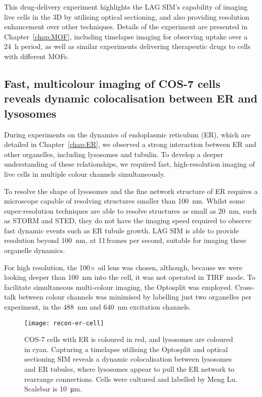 This drug-delivery experiment highlights the LAG SIM's capability of imaging live cells in the 3D by utilising optical sectioning, and also providing resolution enhancement over other techniques. 
Details of the experiment are presented in Chapter~\ref{chap:MOF}, including timelapse imaging for observing uptake over a \SI{24}{\hour} period, as well as similar experiments delivering therapeutic drugs to cells with different MOFs. 

\subsection{Fast, multicolour imaging of COS-7 cells reveals dynamic colocalisation between ER and lysosomes}
During experiments on the dynamics of endoplasmic reticulum (ER), which are detailed in Chapter~\ref{chap:ER}, we observed a strong interaction between ER and other organelles, including lysosomes and tubulin. 
To develop a deeper understanding of these relationships, we required fast, high-resolution imaging of live cells in multiple colour channels simultaneously. 

To resolve the shape of lysosomes and the fine network structure of ER requires a microscope capable of resolving structures smaller than \SI{100}{\nano\metre}. 
Whilst some super-resolution techniques are able to resolve structures as small as \SI{20}{\nano\metre}, such as STORM and STED, they do not have the imaging speed required to observe fast dynamic events such as ER tubule growth. 
LAG SIM is able to provide resolution beyond \SI{100}{\nano\metre}, at 11\,frames per second, suitable for imaging these organelle dynamics. 

For high resolution, the 100$\times$ oil lens was chosen, although, because we were looking deeper than \SI{100}{\nano\metre} into the cell, it was not operated in TIRF mode. 
To facilitate simultaneous multi-colour imaging, the Optosplit was employed. 
Cross-talk between colour channels was minimised by labelling just two organelles per experiment, in the \SI{488}{\nano\metre} and \SI{640}{\nano\metre} excitation channels. 

\begin{figure}[tbp!]
\centering
\texttt{[image: recon-er-cell]}
\caption[LAG SIM: Fast, multi-colour imaging of ER in cells reveals co-localisation between lysosomes and ER tubules]{COS-7 cells with ER is coloured in red, and lysosomes are coloured in cyan. Capturing a timelapse utilising the Optosplit and optical sectioning SIM reveals a dynamic colocalisation between lysosomes and ER tubules, where lysosomes appear to pull the ER network to rearrange connections. Cells were cultured and labelled by Meng Lu. Scalebar is \SI{10}{\micro\metre}. }
\label{fig:recon-er-cell}
\end{figure}
\afterpage{\clearpage}

